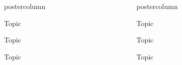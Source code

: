 \documentclass{beamer}
\newlength{\columnheight} %
\begin{document}
\begin{frame}[fragile]{}
\begin{columns}
\begin{column}{.31\textwidth}
\begin{beamercolorbox}[center]{postercolumn}
\begin{minipage}{.98\textwidth}
{\begin{myblock}{Topic}
\end{myblock}
\begin{myblock}{Topic} 
\end{myblock}


\begin{myblock}{Topic} 

\end{myblock}






				}
			\end{minipage}
		\end{beamercolorbox}
	\end{column}
	\begin{column}{.31\textwidth}
		\begin{beamercolorbox}[center]{postercolumn}
			\begin{minipage}{.98\textwidth}
				\parbox[t][\columnheight]{\textwidth}{




\begin{myblock}{Topic} \vspace{-4ex}

\end{myblock}
\begin{myblock}{Topic} 
\end{myblock}


\begin{myblock}{Topic} 

\end{myblock}

			  }
			\end{minipage}
		\end{beamercolorbox}
	\end{column}
\end{columns}

\end{frame}
\end{document}
